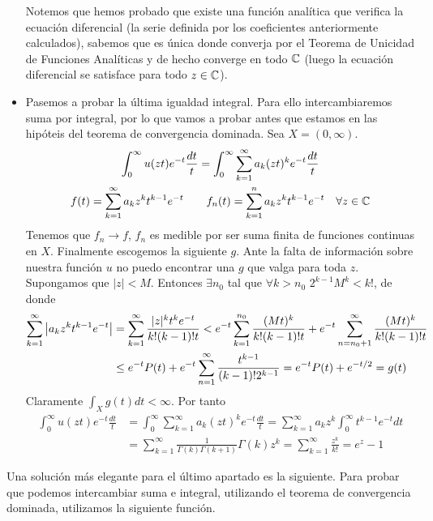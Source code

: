\documentclass[twoside]{article}
\begin{document}
\begin{ejercicio}{6}
\begin{solucion}
\begin{itemize}
Notemos que hemos probado que existe una función analítica que verifica la ecuación diferencial (la serie definida por los coeficientes anteriormente calculados), sabemos que es única donde converja por el Teorema de Unicidad de Funciones Analíticas y de hecho converge en todo $\mathbb{C}$ (luego la ecuación diferencial se satisface para todo $z\in \mathbb{C}$). 
\item Pasemos a probar la última igualdad integral. Para ello intercambiaremos suma por integral, por lo que vamos a probar antes que estamos en las hipóteis del teorema de convergencia dominada. Sea $X=(0,\infty)$.
\begin{gather*}
\int_0^\infty u(zt)e^{-t}\frac{dt}{t} = \int_0^\infty \sum_{k=1}^\infty a_k (zt)^k e^{-t}\frac{dt}{t}\\
f(t)=\sum_{k=1}^\infty a_kz^kt^{k-1}e^{-t}  \qquad f_n(t) = \sum_{k=1}^n a_kz^kt^{k-1}e^{-t} \quad \forall z\in \mathbb{C}
\end{gather*}
Tenemos que $f_n \to f$, $f_n$ es medible por ser suma finita de funciones continuas en $X$. Finalmente escogemos la siguiente $g$. Ante la falta de información sobre nuestra función $u$ no puedo encontrar una $g$ que valga para toda $z$. Supongamos que $|z|<M$. Entonces $\exists n_0$ tal que $\forall k>n_0$ $2^{k-1} M^k<k!$, de donde
\begin{align*}
\sum_{k=1}^\infty \left\lvert a_kz^kt^{k-1}e^{-t}\right\rvert &= \sum_{k=1}^\infty  \frac{|z|^kt^{k}e^{-t}}{k!(k-1)!t} < e^{-t}\sum_{k=1}^{n_0} \frac{(Mt)^k}{k!(k-1)!t} + e^{-t}\sum_{n=n_0+1}^\infty \frac{(Mt)^k}{k!(k-1)!t}\\
&\leq e^{-t}P(t) + e^{-t}\sum_{n=1}^\infty \frac{t^{k-1}}{(k-1)!2^{k-1}} = e^{-t}P(t)+e^{-t/2} =g(t)
\end{align*}
Claramente $\int_X g(t)dt < \infty$. Por tanto
\begin{align*}
\int_0^\infty u(zt)e^{-t}\frac{dt}{t} & = \int_0^\infty \sum_{k=1}^\infty a_k (zt)^k e^{-t}\frac{dt}{t}= \sum_{k=1}^\infty a_k z^k  \int_0^\infty t^{k-1}e^{-t}dt\\
&= \sum_{k=1}^\infty \frac{1}{\Gamma(k)\Gamma(k+1)} \Gamma(k) z^k =  \sum_{k=1}^\infty \frac{z^k}{k!} = e^z -1
\end{align*}
\end{itemize}
\begin{nota}
Una solución más elegante para el último apartado es la siguiente. Para probar que podemos intercambiar suma e integral, utilizando el teorema de convergencia dominada, utilizamos la siguiente función.
\begin{align*}

\end{align*}
\end{nota}
\end{solucion}
\end{ejercicio}
\end{document}
